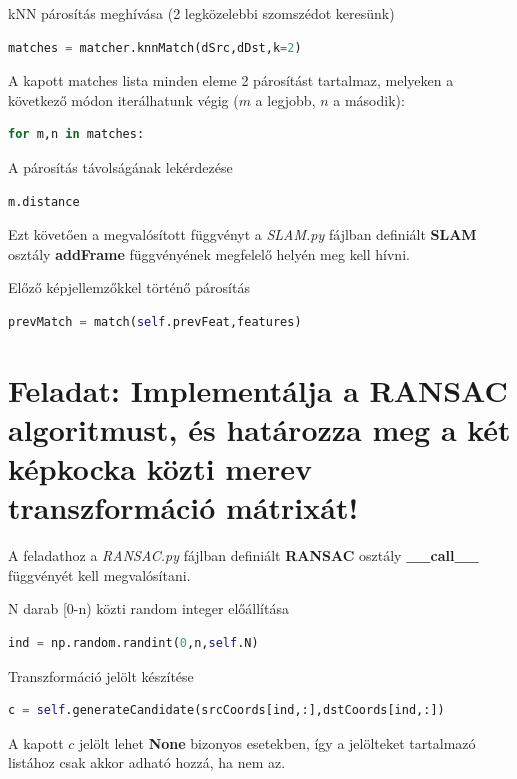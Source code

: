 \documentclass[12pt,a4paper,oneside]{report}             %
\begin{document}
kNN párosítás meghívása (2 legközelebbi szomszédot keresünk)

\begin{lstlisting}[language=Python]
matches = matcher.knnMatch(dSrc,dDst,k=2)
\end{lstlisting}

A kapott matches lista minden eleme 2 párosítást tartalmaz, melyeken a következő módon iterálhatunk végig ($m$ a legjobb, $n$ a második):

\begin{lstlisting}[language=Python]
for m,n in matches:
\end{lstlisting}

A párosítás távolságának lekérdezése

\begin{lstlisting}[language=Python]
m.distance
\end{lstlisting}

Ezt követően a megvalósított függvényt a \emph{SLAM.py} fájlban definiált \textbf{SLAM} osztály \textbf{addFrame} függvényének megfelelő helyén meg kell hívni.

Előző képjellemzőkkel történő párosítás

\begin{lstlisting}[language=Python]
prevMatch = match(self.prevFeat,features)
\end{lstlisting}

\section{Feladat: Implementálja a RANSAC algoritmust, és határozza meg a két képkocka közti merev transzformáció mátrixát!}

A feladathoz a \emph{RANSAC.py} fájlban definiált \textbf{RANSAC} osztály \textbf{\_\_call\_\_} függvényét kell megvalósítani.

N darab [0-n) közti random integer előállítása

\begin{lstlisting}[language=Python]
ind = np.random.randint(0,n,self.N)
\end{lstlisting}

Transzformáció jelölt készítése

\begin{lstlisting}[language=Python]
c = self.generateCandidate(srcCoords[ind,:],dstCoords[ind,:])
\end{lstlisting}

A kapott $c$ jelölt lehet \textbf{None} bizonyos esetekben, így a jelölteket tartalmazó listához csak akkor adható hozzá, ha nem az.
\end{document}

